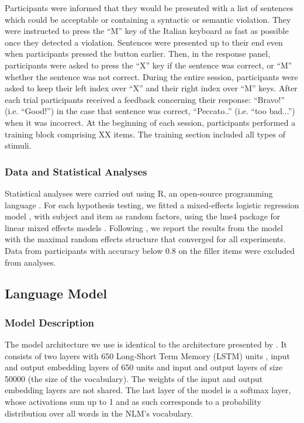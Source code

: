 Participants were informed that they would be presented with a list of sentences which could be acceptable or containing a syntactic or semantic violation. They were instructed to press the “M” key of the Italian keyboard as fast as possible once they detected a violation. Sentences were presented up to their end even when participants pressed the button earlier. Then, in the response panel, participants were asked to press the “X” key if the sentence was correct, or “M” whether the sentence was not correct. During the entire session, participants were asked to keep their left index over “X” and their right index over “M” keys. After each trial participants received a feedback concerning their response: ``Bravo!'' (i.e. ``Good!'') in the case that sentence was correct, ``Peccato..'' (i.e. ``too bad...'') when it was incorrect. At the beginning of each session, participants performed a training block comprising XX items. The training section included all types of stimuli.

\subsubsection{Data and Statistical Analyses}
Statistical analyses were carried out using R, an open-source programming language \citep{R}. For each hypothesis testing, we fitted a mixed-effects logistic regression model \citep{Jaeger2008}, with subject and item as random factors, using the lme4 package for linear mixed effects models \citep{Bates}. Following \citet{Baayen:etal:2008}, we report the results from the model with the maximal random effects structure that converged for all experiments. Data from participants with accuracy below 0.8 on the filler items were excluded from analyses.

\subsection{Language Model}
\subsubsection{Model Description}
The model architecture we use is identical to the architecture presented by \citet{Gulordava:etal:2018}. 
It consists of two layers with 650 Long-Short Term Memory (LSTM) units \citep{Hochreiter:Schmidhuber:1997}, input and output embedding layers of 650 units and input and output layers of size 50000 (the size of the vocabulary). The weights of the input and output embedding layers are not shared.
The last layer of the model is a softmax layer, whose activations sum up to 1 and as such corresponds to a probability distribution over all words in the NLM's vocabulary.

